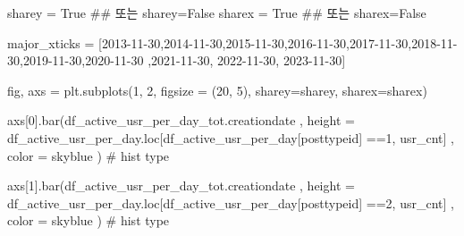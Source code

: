 \documentclass[
  letterpaper,
  DIV=11,
  numbers=noendperiod]{scrartcl}
\newenvironment{Shaded}{\begin{snugshade}}{\end{snugshade}}
\newcommand{\CommentTok}[1]{\textcolor[rgb]{0.37,0.37,0.37}{#1}}
\newcommand{\DecValTok}[1]{\textcolor[rgb]{0.68,0.00,0.00}{#1}}
\newcommand{\NormalTok}[1]{\textcolor[rgb]{0.00,0.23,0.31}{#1}}
\newcommand{\OperatorTok}[1]{\textcolor[rgb]{0.37,0.37,0.37}{#1}}
\newcommand{\StringTok}[1]{\textcolor[rgb]{0.13,0.47,0.30}{#1}}
\newcommand{\VariableTok}[1]{\textcolor[rgb]{0.07,0.07,0.07}{#1}}
\begin{document}
\begin{Shaded}
\begin{Highlighting}[]
\NormalTok{sharey }\OperatorTok{=} \VariableTok{True} \CommentTok{\#\# 또는 sharey=False}
\NormalTok{sharex }\OperatorTok{=} \VariableTok{True} \CommentTok{\#\# 또는 sharex=False}


\NormalTok{major\_xticks }\OperatorTok{=}\NormalTok{ [}\StringTok{\textquotesingle{}2013{-}11{-}30\textquotesingle{}}\NormalTok{,}\StringTok{\textquotesingle{}2014{-}11{-}30\textquotesingle{}}\NormalTok{,}\StringTok{\textquotesingle{}2015{-}11{-}30\textquotesingle{}}\NormalTok{,}\StringTok{\textquotesingle{}2016{-}11{-}30\textquotesingle{}}\NormalTok{,}\StringTok{\textquotesingle{}2017{-}11{-}30\textquotesingle{}}\NormalTok{,}\StringTok{\textquotesingle{}2018{-}11{-}30\textquotesingle{}}\NormalTok{,}\StringTok{\textquotesingle{}2019{-}11{-}30\textquotesingle{}}\NormalTok{,}\StringTok{\textquotesingle{}2020{-}11{-}30\textquotesingle{}}
\NormalTok{                ,}\StringTok{\textquotesingle{}2021{-}11{-}30\textquotesingle{}}\NormalTok{, }\StringTok{\textquotesingle{}2022{-}11{-}30\textquotesingle{}}\NormalTok{, }\StringTok{\textquotesingle{}2023{-}11{-}30\textquotesingle{}}\NormalTok{]}

\NormalTok{fig, axs }\OperatorTok{=}\NormalTok{ plt.subplots(}\DecValTok{1}\NormalTok{, }\DecValTok{2}\NormalTok{, figsize }\OperatorTok{=}\NormalTok{ (}\DecValTok{20}\NormalTok{, }\DecValTok{5}\NormalTok{), sharey}\OperatorTok{=}\NormalTok{sharey, sharex}\OperatorTok{=}\NormalTok{sharex)}


\NormalTok{axs[}\DecValTok{0}\NormalTok{].bar(df\_active\_usr\_per\_day\_tot.creationdate}
\NormalTok{    ,  height }\OperatorTok{=}\NormalTok{ df\_active\_usr\_per\_day.loc[df\_active\_usr\_per\_day[}\StringTok{\textquotesingle{}posttypeid\textquotesingle{}}\NormalTok{] }\OperatorTok{==}\StringTok{\textquotesingle{}1\textquotesingle{}}\NormalTok{, }\StringTok{\textquotesingle{}usr\_cnt\textquotesingle{}}\NormalTok{]}
\NormalTok{    ,  color }\OperatorTok{=} \StringTok{\textquotesingle{}skyblue\textquotesingle{}}
\NormalTok{      ) }\CommentTok{\# hist type}

\NormalTok{axs[}\DecValTok{1}\NormalTok{].bar(df\_active\_usr\_per\_day\_tot.creationdate}
\NormalTok{    ,  height }\OperatorTok{=}\NormalTok{ df\_active\_usr\_per\_day.loc[df\_active\_usr\_per\_day[}\StringTok{\textquotesingle{}posttypeid\textquotesingle{}}\NormalTok{] }\OperatorTok{==}\StringTok{\textquotesingle{}2\textquotesingle{}}\NormalTok{, }\StringTok{\textquotesingle{}usr\_cnt\textquotesingle{}}\NormalTok{]}
\NormalTok{    ,  color }\OperatorTok{=} \StringTok{\textquotesingle{}skyblue\textquotesingle{}}
\NormalTok{      ) }\CommentTok{\# hist type}


\end{Highlighting}
\end{Shaded}
\end{document}
